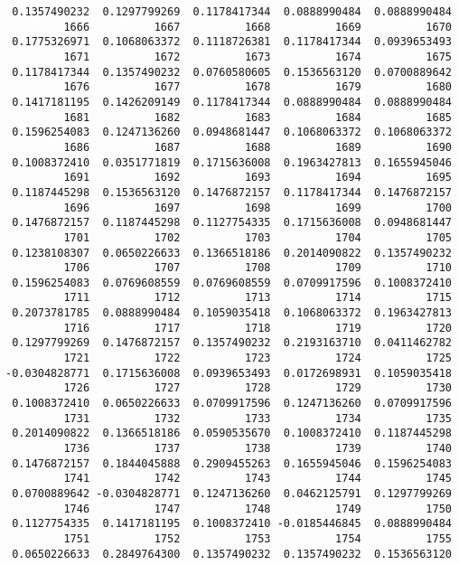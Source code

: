 \documentclass[
  letterpaper,
  DIV=11,
  numbers=noendperiod]{scrreprt}
\begin{document}
\begin{verbatim}
 0.1357490232  0.1297799269  0.1178417344  0.0888990484  0.0888990484 
         1666          1667          1668          1669          1670 
 0.1775326971  0.1068063372  0.1118726381  0.1178417344  0.0939653493 
         1671          1672          1673          1674          1675 
 0.1178417344  0.1357490232  0.0760580605  0.1536563120  0.0700889642 
         1676          1677          1678          1679          1680 
 0.1417181195  0.1426209149  0.1178417344  0.0888990484  0.0888990484 
         1681          1682          1683          1684          1685 
 0.1596254083  0.1247136260  0.0948681447  0.1068063372  0.1068063372 
         1686          1687          1688          1689          1690 
 0.1008372410  0.0351771819  0.1715636008  0.1963427813  0.1655945046 
         1691          1692          1693          1694          1695 
 0.1187445298  0.1536563120  0.1476872157  0.1178417344  0.1476872157 
         1696          1697          1698          1699          1700 
 0.1476872157  0.1187445298  0.1127754335  0.1715636008  0.0948681447 
         1701          1702          1703          1704          1705 
 0.1238108307  0.0650226633  0.1366518186  0.2014090822  0.1357490232 
         1706          1707          1708          1709          1710 
 0.1596254083  0.0769608559  0.0769608559  0.0709917596  0.1008372410 
         1711          1712          1713          1714          1715 
 0.2073781785  0.0888990484  0.1059035418  0.1068063372  0.1963427813 
         1716          1717          1718          1719          1720 
 0.1297799269  0.1476872157  0.1357490232  0.2193163710  0.0411462782 
         1721          1722          1723          1724          1725 
-0.0304828771  0.1715636008  0.0939653493  0.0172698931  0.1059035418 
         1726          1727          1728          1729          1730 
 0.1008372410  0.0650226633  0.0709917596  0.1247136260  0.0709917596 
         1731          1732          1733          1734          1735 
 0.2014090822  0.1366518186  0.0590535670  0.1008372410  0.1187445298 
         1736          1737          1738          1739          1740 
 0.1476872157  0.1844045888  0.2909455263  0.1655945046  0.1596254083 
         1741          1742          1743          1744          1745 
 0.0700889642 -0.0304828771  0.1247136260  0.0462125791  0.1297799269 
         1746          1747          1748          1749          1750 
 0.1127754335  0.1417181195  0.1008372410 -0.0185446845  0.0888990484 
         1751          1752          1753          1754          1755 
 0.0650226633  0.2849764300  0.1357490232  0.1357490232  0.1536563120 

\end{verbatim}
\end{document}
